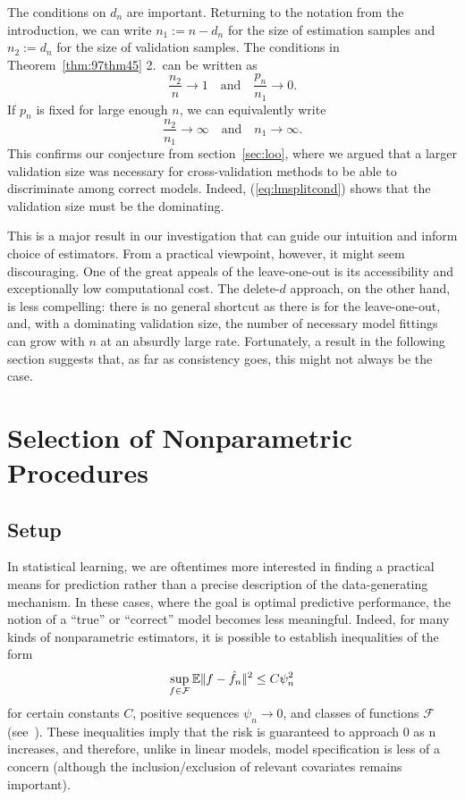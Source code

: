 \documentclass[11pt, letter paper]{article}
\newcommand{\1}{\mathmybb{1}}
\newcommand{\0}{\emptyset}
\newcommand{\E}{\mathbb{E}}
\newcommand{\paren}[1]{\left(#1 \right)}
\newcommand{\norm}[1]{|\hspace{-1pt}|#1 |\hspace{-1pt}|}
\newcommand{\normsq}[1]{\norm{#1}^{2}}
\newcommand{\Fcal}{\mathcal{F}}
\begin{document}
The conditions on \(d_{n}\) are important. Returning to the notation from the introduction, we can write \(n_{1}:=n-d_{n}\) for the size of estimation samples and \(n_{2}:=d_{n}\) for the size of validation samples. The conditions in Theorem~\ref{thm:97thm45} 2.\ can be written as 
\[\frac{n_{2}}{n}\to 1\quad\text{and}\quad \frac{p_{n}}{n_{1}}\to 0.\]
If \(p_{n}\) is fixed for large enough \(n\), we can equivalently write
\begin{equation}\label{eq:lmsplitcond}
    \frac{n_{2}}{n_{1}}\to\infty\quad\text{and}\quad n_{1}\to \infty.
\end{equation}
This confirms our conjecture from section~{\ref{sec:loo}}, where we argued that a larger validation size was necessary for cross-validation methods to be able to discriminate among correct models. Indeed, (\ref{eq:lmsplitcond}) shows that the validation size must be the dominating.

This is a major result in our investigation that can guide our intuition and inform choice of estimators. From a practical viewpoint, however, it might seem discouraging. One of the great appeals of the leave-one-out is its accessibility and exceptionally low computational cost. The delete-\(d\) approach, on the other hand, is less compelling: there is no general shortcut as there is for the leave-one-out, and, with a dominating validation size, the number of necessary model fittings can grow with \(n\) at an absurdly large rate. Fortunately, a result in the following section suggests that, as far as consistency goes, this might not always be the case. 



\section{Selection of Nonparametric Procedures}\label{sec:yang}

\subsection{Setup}

In statistical learning, we are oftentimes more interested in finding a practical means for prediction rather than a precise description of the data-generating mechanism. In these cases, where the goal is optimal predictive performance, the notion of a ``true'' or ``correct'' model becomes less meaningful. Indeed, for many kinds of nonparametric estimators, it is possible to establish inequalities of the form
\[\sup_{f\in\Fcal}\E{\normsq{f - \hat{f}_{n}}} \leq C\psi_{n}^{2}\]
for certain constants \(C\), positive sequences \(\psi_{n}\to 0\), and classes of functions \(\Fcal\) (see~\cite{tsybakov_introduction_2009}). These inequalities imply that the risk is guaranteed to approach 0 as n increases, and therefore, unlike in linear models, model specification is less of a concern (although the inclusion/exclusion of relevant covariates remains important). 
\end{document}
